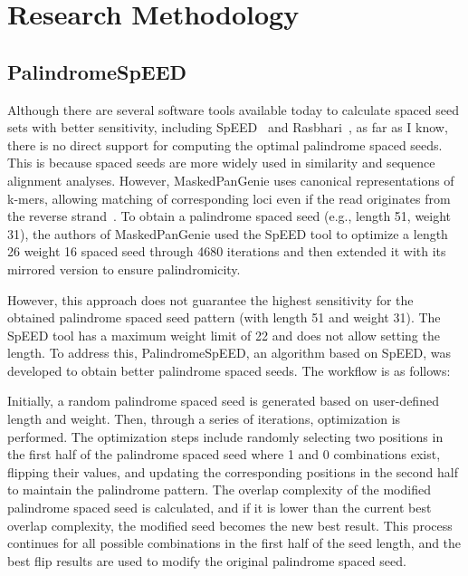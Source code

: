 \documentclass{PHlab-thesis}
\begin{document}
\chapter{Research Methodology}
\section{PalindromeSpEED}
Although there are several software tools available today to calculate spaced seed sets with better sensitivity, including SpEED~\cite{Lucian2011SpEED} and Rasbhari~\cite{Hahn2016Rasbhari}, as far as I know, there is no direct support for computing the optimal palindrome spaced seeds. This is because spaced seeds are more widely used in similarity and sequence alignment analyses. However, MaskedPanGenie uses canonical representations of k-mers, allowing matching of corresponding loci even if the read originates from the reverse strand~\cite{haimo2023MaskedPanGenie}. To obtain a palindrome spaced seed (e.g., length 51, weight 31), the authors of MaskedPanGenie used the SpEED tool to optimize a length 26 weight 16 spaced seed through 4680 iterations and then extended it with its mirrored version to ensure palindromicity.

However, this approach does not guarantee the highest sensitivity for the obtained palindrome spaced seed pattern (with length 51 and weight 31). The SpEED tool has a maximum weight limit of 22 and does not allow setting the length. To address this, PalindromeSpEED, an algorithm based on SpEED, was developed to obtain better palindrome spaced seeds. The workflow is as follows:

Initially, a random palindrome spaced seed is generated based on user-defined length and weight. Then, through a series of iterations, optimization is performed. The optimization steps include randomly selecting two positions in the first half of the palindrome spaced seed where 1 and 0 combinations exist, flipping their values, and updating the corresponding positions in the second half to maintain the palindrome pattern. The overlap complexity of the modified palindrome spaced seed is calculated, and if it is lower than the current best overlap complexity, the modified seed becomes the new best result. This process continues for all possible combinations in the first half of the seed length, and the best flip results are used to modify the original palindrome spaced seed.
\end{document}
